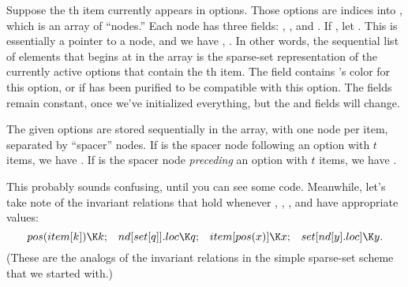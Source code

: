 Suppose the th item  currently appears in  options.
Those options
are indices into , which is an array of ``nodes.'' Each node
has three fields: , , and . If , let .
This is essentially a pointer to a node, and we have
, . In other
words,
the sequential list of  elements that begins at
 in the  array is the sparse-set
representation of the
currently active options that contain the th item.
The  field contains 's color for this option, or  if
 has been purified to be compatible with this option.
The  fields remain constant,
once we've initialized everything, but the  and  fields
will change.

The given options are stored sequentially in the  array, with one
node
per item, separated by ``spacer'' nodes. If  is the spacer node
following an option with $t$ items, we have .
If  is the spacer node {\it preceding\/} an option with $t$ items,
we have .

This probably sounds confusing, until you can see some code.
Meanwhile, let's take note of the invariant relations that hold
whenever , , , and  have appropriate values:
$$\hbox{\PB{$\\{pos}(\\{item}[\|k])\K\|k$};\quad
\PB{$\\{nd}[\\{set}[\|q]].\\{loc}\K\|q$};\quad
\PB{$\\{item}[\\{pos}(\|x)]\K\|x$};\quad
\PB{$\\{set}[\\{nd}[\|y].\\{loc}]\K\|y$}.}$$
(These are the analogs of the invariant relations  in
the simple sparse-set scheme that we started with.)

